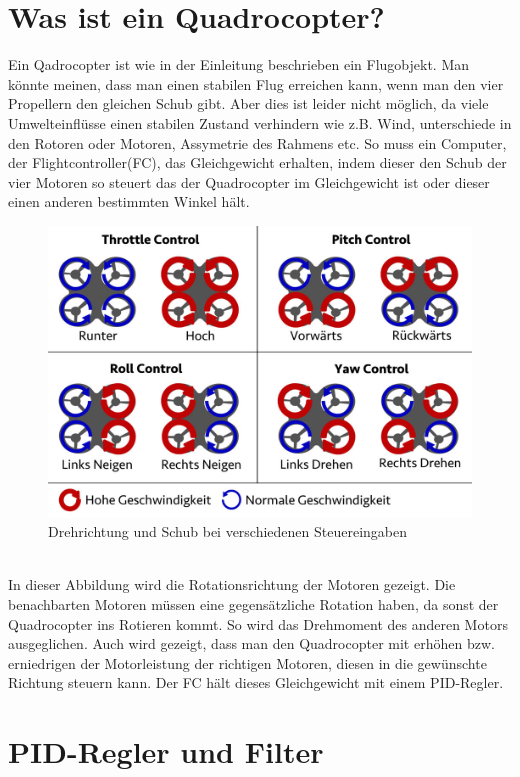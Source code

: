 \documentclass[12pt,a4paper, ngerman]{article}
\begin{document}
\section{Was ist ein Quadrocopter?}
Ein Qadrocopter ist wie in der Einleitung beschrieben ein Flugobjekt. Man könnte meinen, dass man einen stabilen Flug erreichen kann, wenn man den vier Propellern den gleichen Schub gibt. Aber dies ist leider nicht möglich, da viele Umwelteinflüsse einen stabilen Zustand verhindern wie z.B. Wind, unterschiede in den Rotoren oder Motoren, Assymetrie des Rahmens etc. So muss ein Computer, der Flightcontroller(FC), das Gleichgewicht erhalten, indem dieser den Schub der vier Motoren so steuert das der Quadrocopter im Gleichgewicht ist oder dieser einen anderen bestimmten Winkel hält.\\
\begin{figure}[h]
\centering
\includegraphics[width=\textwidth]{MotionDE.jpg}
\caption[https://fpvracing.ch/de/content/7-grundsatzliche-funktion-quadrocopter-multicopter]{Drehrichtung und Schub bei verschiedenen Steuereingaben }
\end{figure}\\
In dieser Abbildung wird die Rotationsrichtung der Motoren gezeigt. Die benachbarten Motoren müssen eine gegensätzliche Rotation haben, da sonst der Quadrocopter ins Rotieren kommt. So wird das Drehmoment des anderen Motors ausgeglichen. Auch wird gezeigt, dass man den Quadrocopter mit erhöhen bzw. erniedrigen der Motorleistung der richtigen Motoren, diesen in die gewünschte Richtung steuern kann. Der FC hält dieses Gleichgewicht mit einem PID-Regler.


\section{PID-Regler und Filter}
\end{document}

